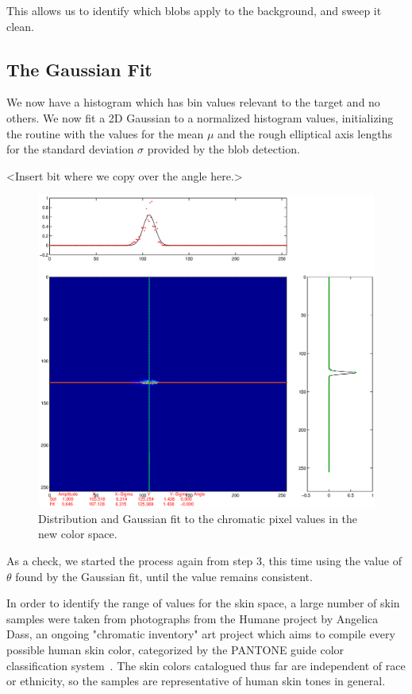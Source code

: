 This allows us to identify which blobs apply to the background, and sweep it clean.


\subsection{The Gaussian Fit}\label{sec:TheGaussianFit}
We now have a histogram which has bin values relevant to the target and no others. We now fit a 2D Gaussian to a normalized histogram values, initializing the routine with the values for the mean $\mu$ and the rough elliptical axis lengths for the standard deviation $\sigma$ provided by the blob detection.

<Insert bit where we copy over the angle here.>  

\begin{figure}[h!]
  \centering
    \includegraphics[width=\textwidth]{Chapter3/Figs/crosshairFigureFinal.eps}
    \caption{Distribution and Gaussian fit to the chromatic pixel values in the new color space.}  \label{fig:DistributionAndGaussianFit}
\end{figure}

As a check, we started the process again from step 3, this time using the value of $\theta$ found by the Gaussian fit, until the value remains consistent.




In order to identify the range of values for the skin space, a large number of skin samples were taken from photographs from the Humane project by Angelica Dass, an ongoing "chromatic inventory" art project which aims to compile every possible human skin color, categorized by the PANTONE guide color classification system~\cite{Dass2012}. The skin colors catalogued thus far are independent of race or ethnicity, so the samples are representative of human skin tones in general.

